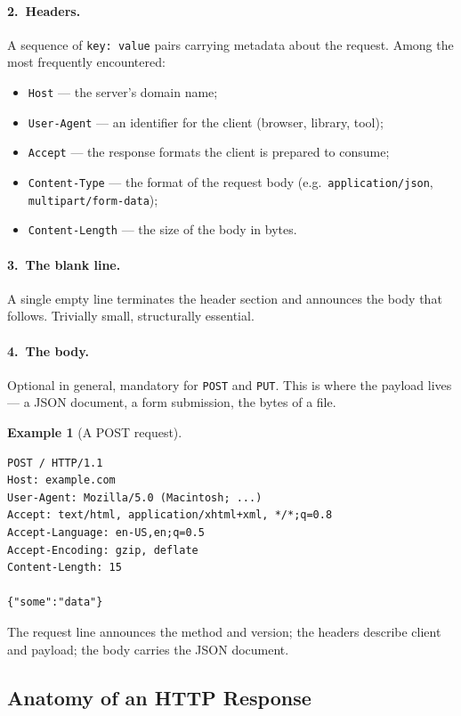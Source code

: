 \documentclass[11pt,a4paper]{article}
\theoremstyle{definition}
\newtheorem{example}[definition]{Example}
\theoremstyle{remark}
\begin{document}
\paragraph{2.\ Headers.}
A sequence of \texttt{key: value} pairs carrying metadata about the request. Among the most frequently encountered:
\begin{itemize}
    \item \texttt{Host} --- the server's domain name;
    \item \texttt{User-Agent} --- an identifier for the client (browser, library, tool);
    \item \texttt{Accept} --- the response formats the client is prepared to consume;
    \item \texttt{Content-Type} --- the format of the request body (e.g.\ \texttt{application/json}, \texttt{multipart/form-data});
    \item \texttt{Content-Length} --- the size of the body in bytes.
\end{itemize}

\paragraph{3.\ The blank line.}
A single empty line terminates the header section and announces the body that follows. Trivially small, structurally essential.

\paragraph{4.\ The body.}
Optional in general, mandatory for \texttt{POST} and \texttt{PUT}. This is where the payload lives --- a JSON document, a form submission, the bytes of a file.

\begin{example}[A POST request]
\begin{lstlisting}[language=http]
POST / HTTP/1.1
Host: example.com
User-Agent: Mozilla/5.0 (Macintosh; ...)
Accept: text/html, application/xhtml+xml, */*;q=0.8
Accept-Language: en-US,en;q=0.5
Accept-Encoding: gzip, deflate
Content-Length: 15

{"some":"data"}
\end{lstlisting}
The request line announces the method and version; the headers describe client and payload; the body carries the JSON document.
\end{example}

\subsection{Anatomy of an HTTP Response}
\end{document}
